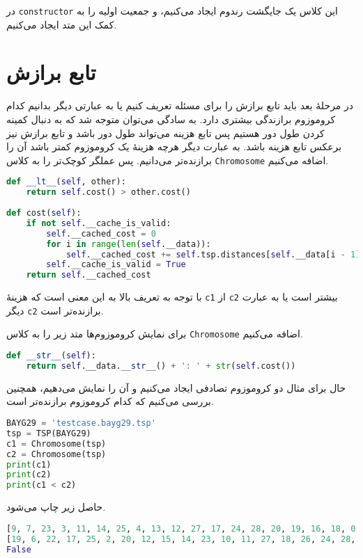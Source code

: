\documentclass[a4paper, 12pt]{article}
\theoremstyle{definition}
\begin{document}
در
\texttt{constructor}
این کلاس یک جایگشت رندوم ایجاد می‌کنیم، و جمعیت اولیه را به کمک این متد ایجاد می‌کنیم.

\section{تابع برازش}

در مرحلهٔ بعد باید تابع برازش را برای مسئله تعریف کنیم یا به عبارتی دیگر بدانیم کدام کروموزوم برازندگی بیشتری دارد. به سادگی می‌توان متوجه شد که به دنبال کمینه کردن طول دور هستیم پس تابع هزینه می‌تواند طول دور باشد و تابع برازش نیز برعکس تابع هزینه باشد. به عبارت دیگر هرچه هزینهٔ یک کروموزوم کمتر باشد آن را برازنده‌تر می‌دانیم. پس عملگر کوچک‌تر را به کلاس
\texttt{Chromosome}
اضافه می‌کنیم.

\LTR
\begin{lstlisting}[language=Python]
def __lt__(self, other):
    return self.cost() > other.cost()
    
def cost(self):
    if not self.__cache_is_valid:
        self.__cached_cost = 0
        for i in range(len(self.__data)):
            self.__cached_cost += self.tsp.distances[self.__data[i - 1]][self.__data[i]]
        self.__cache_is_valid = True
    return self.__cached_cost
\end{lstlisting}
\RTL

با توجه به تعریف بالا
به این معنی است که هزینهٔ
\texttt{c1}
از
\texttt{c2}
بیشتر است یا به عبارت دیگر
\texttt{c2}
برازنده‌تر است.

برای نمایش کروموزوم‌ها متد زیر را به کلاس
\texttt{Chromosome}
اضافه می‌کنیم.

\LTR
\begin{lstlisting}[language=Python]
def __str__(self):
    return self.__data.__str__() + ': ' + str(self.cost())
\end{lstlisting}
\RTL

حال برای مثال دو کروموزوم تصادفی ایجاد می‌کنیم و آن را نمایش می‌دهیم، همچنین بررسی می‌کنیم که کدام کروموزوم برازنده‌تر است.

\LTR
\begin{lstlisting}[language=Python]
BAYG29 = 'testcase.bayg29.tsp'
tsp = TSP(BAYG29)
c1 = Chromosome(tsp)
c2 = Chromosome(tsp)
print(c1)
print(c2)
print(c1 < c2)
\end{lstlisting}
\RTL

حاصل زیر چاپ می‌شود.

\LTR
\begin{lstlisting}[language=Python]
[9, 7, 23, 3, 11, 14, 25, 4, 13, 12, 27, 17, 24, 28, 20, 19, 16, 18, 0, 5, 26, 6, 15, 22, 8, 21, 1, 10, 2]: 4920
[19, 6, 22, 17, 25, 2, 20, 12, 15, 14, 23, 10, 11, 27, 18, 26, 24, 28, 9, 4, 21, 1, 8, 13, 0, 16, 5, 7, 3]: 4980
False    
\end{lstlisting}
\RTL
\end{document}
